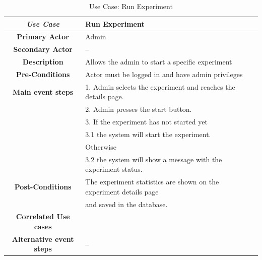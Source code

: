 \begin{table}[ht!]
    \centering
    \caption{Use Case: Run Experiment}
    \begin{tabularx}{\textwidth}{|Sl|S{X}|}
        \hline
        \textbf{\textit{Use Case}}       & \textbf{Run Experiment}                                                     \\ \hline
        \textbf{Primary Actor}           & Admin                                                                       \\ \hline
        \textbf{Secondary Actor}         & --                                                                          \\ \hline
        \textbf{Description}             & Allows the admin to start a specific experiment                             \\ \hline
        \textbf{Pre-Conditions}          & Actor must be logged in and have admin privileges                           \\ \hline
        \textbf{Main event steps}        & 1. Admin selects the experiment and reaches the details page.               \\
                                         & 2. Admin presses the start button.                                          \\
                                         & 3. If the experiment has not started yet                                    \\
                                         & \hspace{1em} 3.1 the system will start the experiment.                      \\
                                         & Otherwise                                                                   \\
                                         & \hspace{1em} 3.2 the system will show a message with the experiment status. \\ \hline
        \textbf{Post-Conditions}         & The experiment statistics are shown on the experiment details page          \\
                                         & and saved in the database.                                                  \\ \hline
        \textbf{Correlated Use cases}    &                                                                             \\ \hline
        \textbf{Alternative event steps} & --                                                                          \\ \hline
    \end{tabularx}
\end{table}



